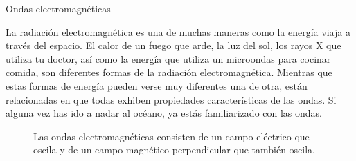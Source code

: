 \begin{sectionbox}{Ondas electromagnéticas}

    \begin{minipage}{0.38\linewidth}
        La radiación electromagnética es una de muchas maneras como la energía viaja a través del espacio. El calor de un fuego que arde, la luz del sol, los rayos X que utiliza tu doctor, así como la energía que utiliza un microondas para cocinar comida, son diferentes formas de la radiación electromagnética. Mientras que estas formas de energía pueden verse muy diferentes una de otra, están relacionadas en que todas exhiben propiedades características de las ondas.
        Si alguna vez has ido a nadar al océano, ya estás familiarizado con las ondas. 
    \end{minipage}\qquad%
    \begin{minipage}{0.5\linewidth}
        \begin{figure}[H]
            \centering
            \caption{Las ondas electromagnéticas consisten de un campo eléctrico que oscila y de un campo magnético perpendicular que también oscila.}
            \label{fig:emwave}
\end{figure}
\end{minipage}
\end{sectionbox}
